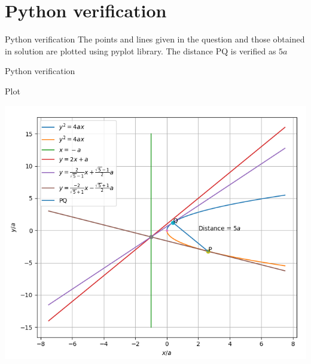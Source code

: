 \documentclass[12pt]{beamer}
\begin{document}
\section{Python verification}
\begin{frame}{Python verification}
The points and lines given in the question and those obtained in solution are plotted using pyplot library. The distance PQ is verified as $5a$
\end{frame}
\begin{frame}{Python verification}
\begin{block}{Plot}
\begin{center}
\includegraphics[scale=0.3]{figs/pyplot.png}
\end{center}
\end{block}

\end{frame}
\end{document}
